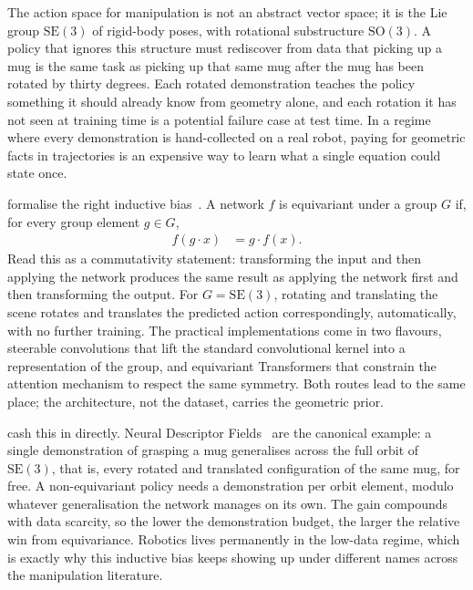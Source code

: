  The action space for manipulation is not an abstract vector space; it is the Lie group $\mathrm{SE}(3)$ of rigid-body poses, with rotational substructure $\mathrm{SO}(3)$. A policy that ignores this structure must rediscover from data that picking up a mug is the same task as picking up that same mug after the mug has been rotated by thirty degrees. Each rotated demonstration teaches the policy something it should already know from geometry alone, and each rotation it has not seen at training time is a potential failure case at test time. In a regime where every demonstration is hand-collected on a real robot, paying for geometric facts in trajectories is an expensive way to learn what a single equation could state once.

 formalise the right inductive bias~\cite{CohenWelling2016GroupEquivariant}. A network $f$ is equivariant under a group $G$ if, for every group element $g \in G$,
\begin{align*}
    f(g \cdot x) &= g \cdot f(x).
\end{align*}
Read this as a commutativity statement: transforming the input and then applying the network produces the same result as applying the network first and then transforming the output. For $G = \mathrm{SE}(3)$, rotating and translating the scene rotates and translates the predicted action correspondingly, automatically, with no further training. The practical implementations come in two flavours, steerable convolutions that lift the standard convolutional kernel into a representation of the group, and equivariant Transformers that constrain the attention mechanism to respect the same symmetry. Both routes lead to the same place; the architecture, not the dataset, carries the geometric prior.

 cash this in directly. Neural Descriptor Fields~\cite{Simeonov2022NDF} are the canonical example: a single demonstration of grasping a mug generalises across the full orbit of $\mathrm{SE}(3)$, that is, every rotated and translated configuration of the same mug, for free. A non-equivariant policy needs a demonstration per orbit element, modulo whatever generalisation the network manages on its own. The gain compounds with data scarcity, so the lower the demonstration budget, the larger the relative win from equivariance. Robotics lives permanently in the low-data regime, which is exactly why this inductive bias keeps showing up under different names across the manipulation literature.

